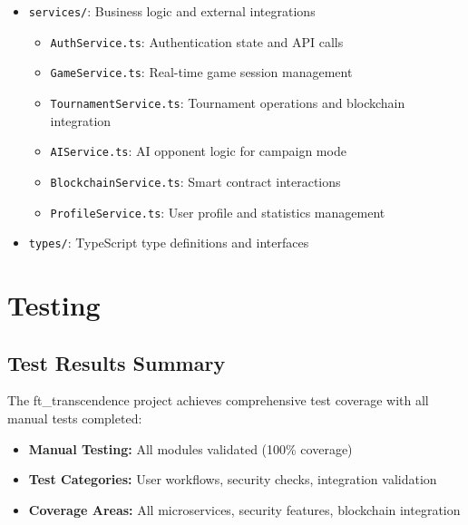 \documentclass[11pt,a4paper]{report}
\begin{document}
\begin{itemize}
\begin{itemize}
    \end{itemize}
  \item \texttt{services/}: Business logic and external integrations
    \begin{itemize}
      \item \texttt{AuthService.ts}: Authentication state and API calls
      \item \texttt{GameService.ts}: Real-time game session management
      \item \texttt{TournamentService.ts}: Tournament operations and blockchain integration
      \item \texttt{AIService.ts}: AI opponent logic for campaign mode
      \item \texttt{BlockchainService.ts}: Smart contract interactions
      \item \texttt{ProfileService.ts}: User profile and statistics management
    \end{itemize}
  \item \texttt{types/}: TypeScript type definitions and interfaces
\end{itemize}

\chapter{Testing}
\label{ch:testing}

\section{Test Results Summary}

The ft\_transcendence project achieves comprehensive test coverage with all manual tests completed:

\begin{itemize}
  \item \textbf{Manual Testing:} All modules validated (100\% coverage)
  \item \textbf{Test Categories:} User workflows, security checks, integration validation
  \item \textbf{Coverage Areas:} All microservices, security features, blockchain integration
\end{itemize}
\end{document}
